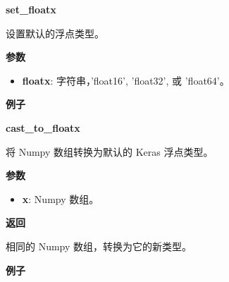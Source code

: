 \textbf{set\_floatx}\label{setux5ffloatx}

\begin{Shaded}
\begin{Highlighting}[]
\end{Highlighting}
\end{Shaded}

设置默认的浮点类型。

\textbf{参数}

\begin{itemize}
\tightlist
\item
  \textbf{floatx}: 字符串，'float16', 'float32', 或 'float64'。
\end{itemize}

\textbf{例子}

\begin{Shaded}
\begin{Highlighting}[]
\OperatorTok{>>>}    
\OperatorTok{>>>} 
\OperatorTok{>>>} \NormalTok{)}
\OperatorTok{>>>} 
\end{Highlighting}
\end{Shaded}


\textbf{cast\_to\_floatx}\label{castux5ftoux5ffloatx}

\begin{Shaded}
\begin{Highlighting}[]
\end{Highlighting}
\end{Shaded}

将 Numpy 数组转换为默认的 Keras 浮点类型。

\textbf{参数}

\begin{itemize}
\tightlist
\item
  \textbf{x}: Numpy 数组。
\end{itemize}

\textbf{返回}

相同的 Numpy 数组，转换为它的新类型。

\textbf{例子}


